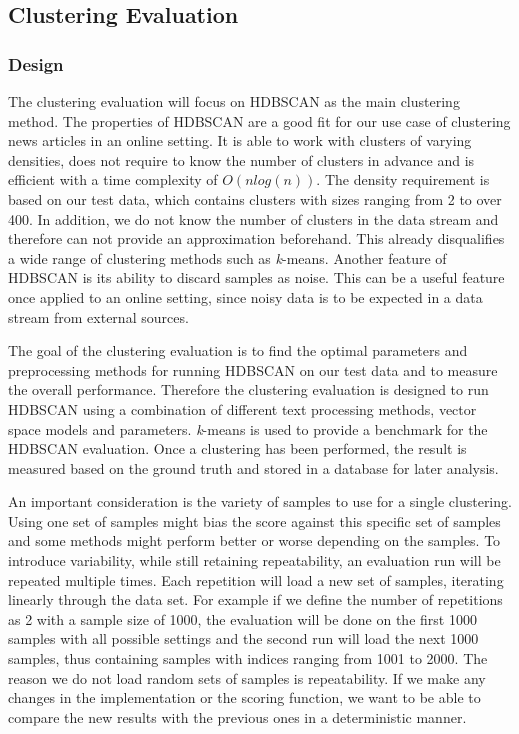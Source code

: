 \subsection{Clustering Evaluation}
\label{subsec:4b_clustering_evaluation}

\subsubsection{Design}
\label{subsubsec:4b_design}

The clustering evaluation will focus on HDBSCAN as the main clustering method. 
The properties of HDBSCAN are a good fit for our use case of clustering news articles in an online setting.
It is able to work with clusters of varying densities, 
does not require to know the number of clusters in advance 
and is efficient with a time complexity of $O(nlog(n))$.
The density requirement is based on our test data, which contains clusters with sizes ranging from 2 to over 400. 
In addition, we do not know the number of clusters in the data stream and therefore can not provide an approximation
beforehand. This already disqualifies a wide range of clustering methods such as \textit{k}-means. 
Another feature of HDBSCAN is its ability to discard samples as noise. 
This can be a useful feature once applied to an online setting, 
since noisy data is to be expected in a data stream from external sources. 

The goal of the clustering evaluation is to find the optimal parameters and preprocessing methods
for running HDBSCAN on our test data and to measure the overall performance.
Therefore the clustering evaluation is designed to run HDBSCAN using a combination of different text processing methods, vector space models and parameters.
\textit{k}-means is used to provide a benchmark for the HDBSCAN evaluation.
Once a clustering has been performed,
the result is measured based on the ground truth and stored in a database for later analysis.

An important consideration is the variety of samples to use for a single clustering.
Using one set of samples might bias the score against this specific set of samples
and some methods might perform better or worse depending on the samples.
To introduce variability, while still retaining repeatability, an evaluation run will be repeated multiple times.
Each repetition will load a new set of samples, iterating linearly through the data set.
For example if we define the number of repetitions as 2 with a sample size of 1000,
the evaluation will be done on the first 1000 samples with all possible settings
and the second run will load the next 1000 samples, thus containing samples with indices ranging from 1001 to 2000.
The reason we do not load random sets of samples is repeatability.
If we make any changes in the implementation or the scoring function,
we want to be able to compare the new results with the previous ones in a deterministic manner.


